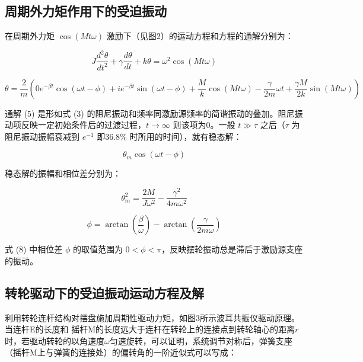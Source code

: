 \documentclass[12pt,a4paper]{amsart}
\begin{document}
\subsection{周期外力矩作用下的受迫振动}

在周期外力矩 $\cos(Mt\omega)$ 激励下（见图2）的运动方程和方程的通解分别为：

\begin{equation}
    J\frac{d^2\theta}{dt^2} + \gamma\frac{d\theta}{dt} + k\theta = \omega^2 \cos(Mt\omega) \tag{4}
\end{equation}

\begin{equation}
    \theta = \frac{2}{m}\left(0 e^{-\beta t}\cos(\omega t - \phi) + i e^{-\beta t}\sin(\omega t - \phi) + \frac{M}{k}\cos(Mt\omega) - \frac{\gamma}{2m}\omega t + \frac{\gamma M}{2k}\sin(Mt\omega)\right) \tag{5}
\end{equation}

通解 (5) 是形如式 (3) 的阻尼振动和频率同激励源频率的简谐振动的叠加。阻尼振动项反映一定初始条件后的过渡过程，$t \rightarrow \infty$ 则该项为0。一般 $t \gg \tau$ 之后（$\tau$ 为阻尼振动振幅衰减到 $e^{-1}$ 即36.8\% 时所用的时间），就有稳态解：

\begin{equation}
    \theta_m \cos(\omega t - \phi) \tag{6}
\end{equation}

稳态解的振幅和相位差分别为：

\begin{equation}
    \theta_m^2 = \frac{2M}{J\omega^2} - \frac{\gamma^2}{4m\omega^2} \tag{7}
\end{equation}

\begin{equation}
    \phi = \arctan\left(\frac{\beta}{\omega}\right) - \arctan\left(\frac{\gamma}{2m\omega}\right) \tag{8}
\end{equation}

式 (8) 中相位差 $\phi$ 的取值范围为 $0 < \phi < \pi$，反映摆轮振动总是滞后于激励源支座的振动。

\subsection{转轮驱动下的受迫振动运动方程及解}

利用转轮连杆结构对摆盘施加周期性驱动力矩，如图3所示波耳共振仪驱动原理。当连杆E的长度和
摇杆M的长度远大于连杆在转轮上的连接点到转轮轴心的距离$r$时，若驱动转轮的以角速度$\omega$匀速旋转，可以证明，系统调节对称后，弹簧支座（摇杆M上与弹簧的连接处）的偏转角的一阶近似式可以写成：
\end{document}
